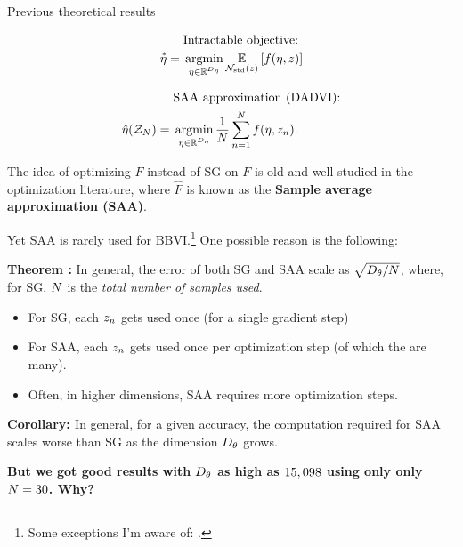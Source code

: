 \begin{frame}[t]{Previous theoretical results}
    \vspace{-3em}
    \begin{minipage}[t]{0.48\textwidth}
        \begin{align*}
            &\text{Intractable objective:} 
            \\ \etastar %
                ={}& 
                \argmin_{\eta \in \etadom} \expect{\normz}{f(\eta, \z)}
        \end{align*}    
    \end{minipage}
    \begin{minipage}[t]{0.48\textwidth}
        \begin{align*}
            &\text{SAA approximation (DADVI):} 
            \\ \etahat(\Z) %
                ={}&  \argmin_{\eta \in \etadom} \meann f(\eta, \z_n).
        \end{align*}
    \end{minipage}
    
    \hrulefill
    
    The idea of optimizing $\hat{F}$ instead of SG on $F$ is old and
    well-studied in the optimization literature, where $\hat{F}$
    is known as the \textbf{Sample average approximation (SAA)}.
    
    Yet SAA is rarely used for BBVI.\footnote{Some exceptions I'm aware of:
    \citet{giordano:2018:covariances,giordano:2022:bnp,wycoff:2022:sparsebayesianlasso,burroni:2023:saabbvi}.}
    One possible reason is the following:
    
    
    \noindent
    \textbf{Theorem \citep{nemirovski:2009:sgdvsfixed}:}
    In general, the error of both SG and SAA scale as
    $\sqrt{{D_{\theta}} / N}$,
    where, for SG, $N$ is the \textit{total number of samples used}.
    
    \pause
    \begin{itemize}
    \item For SG, each $z_n$ gets used once (for a single gradient step)
    \item For SAA, each $z_n$ gets used once per optimization step
    (of which the are many).
    \item Often, in higher dimensions, SAA requires more optimization steps.
    \end{itemize}
    
    
    \noindent
    \textbf{Corollary: \citep{kim:2015:guidetosaa}}
    In general, for a given accuracy, the computation required for SAA 
    scales worse than SG as the dimension ${D_{\theta}}$ grows.
    
    \pause
    \textbf{
    But we got good results with ${D_{\theta}}$ as
    high as $15,098$ using only
    only $N = 30$.  Why?}
    
    
    \end{frame}
    
